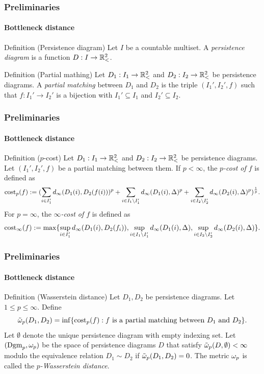 \documentclass[aspectratio=169]{beamer}
\begin{document}
\begin{frame}
  \frametitle{Preliminaries}
  \framesubtitle{Bottleneck distance}

  \begin{block}{Definition (Persistence diagram)}
      Let $ I $ be a countable multiset. A {\it persistence diagram} is a function $ D: I \to \mathbb{R}_<^2 $.
  \end{block}
  \pause
  \begin{block}{Definition (Partial mathing)}
      Let $ D_1: I_1 \to \mathbb{R}_<^2 $ and $ D_2: I_2 \to \mathbb{R}_<^2 $ be persistence diagrams. A {\it partial matching} between $ D_1 $ and $ D_2 $ is the triple $ (I_1', I_2', f) $ such that $ f: I_1' \to I_2' $ is a bijection with $ I_1' \subseteq I_1 $ and $ I_2' \subseteq I_2 $.
  \end{block}

\end{frame}

\begin{frame}
  \frametitle{Preliminaries}
  \framesubtitle{Bottleneck distance}
  \begin{block}{Definition ($p$-cost)}
    Let $ D_1: I_1 \to \mathbb{R}_<^2 $ and $ D_2: I_2 \to \mathbb{R}_<^2 $ be persistence diagrams. Let $ (I_1', I_2', f) $ be a partial matching between them. If $ p < \infty $, the {\it $p$-cost of $ f $} is defined as
    \begin{equation}
        \operatorname{cost}_p(f) := (\sum_{i \in I_1'} d_\infty(D_1(i), D_2(f(i)))^p
        + \sum_{i \in I_1 \setminus I_1'} d_\infty(D_1(i), \Delta)^p
        + \sum_{i \in I_2 \setminus I_2'} d_\infty(D_2(i), \Delta)^p )^{\frac{1}{p}}.
    \end{equation}
    For $ p = \infty $, the {\it $\infty$-cost of $ f $} is defined as
    \begin{equation}
        \operatorname{cost}_\infty(f) := \max \{\sup_{i \in I_1'} d_\infty(D_1(i), D_2(f_i)),
        \sup_{i\in I_1 \setminus I_1'} d_\infty(D_1(i), \Delta),
        \sup_{i\in I_2 \setminus I_2'} d_\infty(D_2(i), \Delta)\}.
    \end{equation}
  \end{block}
\end{frame}

\begin{frame}
  \frametitle{Preliminaries}
  \framesubtitle{Bottleneck distance}
  \begin{block}{Definition (Wasserstein distance)}
    Let $ D_1, D_2 $ be persistence diagrams. Let $ 1 \leq p \leq \infty $. Define
    \begin{equation}
        \tilde \omega_p (D_1, D_2) = \inf \{\operatorname{cost}_p(f) : f \text{ is a partial matching between } D_1 \text{ and } D_2 \}.
    \end{equation}
    Let $ \emptyset $ denote the unique persistence diagram with empty indexing set. Let $ (\operatorname{Dgm}_p, \omega_p) $ be the space of persistence diagrams $ D $ that satisfy $ \tilde \omega_p(D, \emptyset) < \infty $ modulo the equivalence relation $ D_1 \sim D_2 $ if $ \tilde \omega_p (D_1, D_2) = 0 $. The metric $ \omega_p $ is called the {\it $p$-Wasserstein distance}.
  \end{block}
\end{frame}
\end{document}
